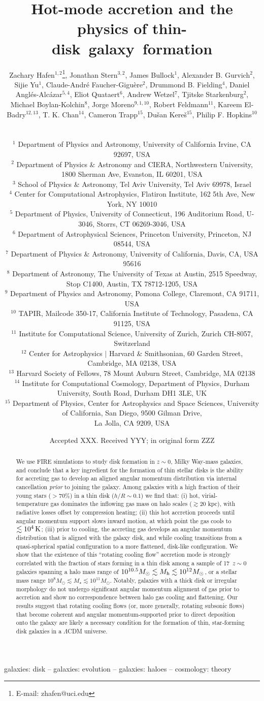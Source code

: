 \documentclass[fleqn,usenatbib]{mnras}
\title[Rotating cooling flows and thin galactic disks]{Hot-mode accretion and the physics of thin-disk~galaxy~formation}
\author[Hafen, Stern, Bullock et al.]{
\parbox{\textwidth}{
Zachary Hafen$^{1,2}$\thanks{E-mail: zhafen@uci.edu},
Jonathan Stern$^{3,2}$,
James Bullock$^{1}$,
Alexander B. Gurvich$^2$,
Sijie Yu$^1$,
Claude-Andr\'e Faucher-Gigu\`ere$^2$,
Drummond B. Fielding$^4$,
Daniel Angl\'es-Alc\'azar$^{5,4}$,
Eliot Quataert$^6$,
Andrew Wetzel$^7$,
Tjitske Starkenburg$^2$,
Michael Boylan-Kolchin$^8$,
Jorge Moreno$^{9,1,10}$,
Robert Feldmann$^{11}$,
Kareem El-Badry$^{12,13}$,
T. K. Chan$^{14}$,
Cameron Trapp$^{15}$,
Du\v{s}an Kere\v{s}$^{15}$,
Philip F. Hopkins$^{10}$
} \vspace{0.4cm}\\
\parbox{\textwidth}{
$^1$ Department of Physics and Astronomy, University of California Irvine, CA 92697, USA \\
$^2$ Department of Physics \& Astronomy and CIERA, Northwestern University, 1800 Sherman Ave, Evanston, IL 60201, USA \\
$^3$ School of Physics \& Astronomy, Tel Aviv University, Tel Aviv 69978, Israel \\
$^4$ Center for Computational Astrophysics, Flatiron Institute, 162 5th Ave, New York, NY 10010 \\
$^5$ Department of Physics, University of Connecticut, 196 Auditorium Road, U-3046, Storrs, CT 06269-3046, USA \\
$^6$ Department of Astrophysical Sciences, Princeton University, Princeton, NJ 08544, USA \\
$^7$ Department of Physics \& Astronomy, University of California, Davis, CA, USA 95616 \\
$^8$ Department of Astronomy, The University of Texas at Austin, 2515 Speedway, Stop C1400, Austin, TX 78712-1205, USA \\
$^9$ Department of Physics and Astronomy, Pomona College, Claremont, CA 91711, USA \\
$^{10}$ TAPIR, Mailcode 350-17, California Institute of Technology, Pasadena, CA 91125, USA \\
$^{11}$ Institute for Computational Science, University of Zurich, Zurich CH-8057, Switzerland \\
$^{12}$ Center for Astrophysics $|$ Harvard \& Smithsonian, 60 Garden Street, Cambridge, MA 02138, USA \\
$^{13}$ Harvard Society of Fellows, 78 Mount Auburn Street, Cambridge, MA 02138 \\
$^{14}$ Institute for Computational Cosmology, Department of Physics, Durham University, South Road, Durham DH1 3LE, UK \\
$^{15}$ Department of Physics, Center for Astrophysics and Space Sciences, University of California, San Diego, 9500 Gilman Drive, \\ La Jolla, CA 9209, USA \\
}
}
\date{Accepted XXX. Received YYY; in original form ZZZ}
\newcommand{\Nsample}{17}
\begin{document}
\label{firstpage}
\pagerange{\pageref{firstpage}--\pageref{lastpage}}
\maketitle

\begin{abstract}
We use FIRE simulations to study disk formation in $z\sim 0$, Milky Way-mass galaxies, and conclude that a key ingredient for the formation of thin stellar disks is the ability for accreting gas to develop an aligned angular momentum distribution via internal cancellation \textit{prior} to joining the galaxy.
Among galaxies with a high fraction of their young stars ($>70\%$) in a thin disk ($h/R \sim 0.1$) we find that:
(i) hot, virial-temperature gas dominates the inflowing gas mass on halo scales ($\gtrsim 20$ kpc), with radiative losses offset by compression heating;
(ii) this hot accretion proceeds until angular momentum support slows inward motion, at which point the gas cools to $\lesssim10^4\,{\rm K}$;
(iii) prior to cooling, the accreting gas develops an angular momentum distribution that is aligned with the galaxy disk, and while cooling transitions from a quasi-spherical spatial configuration to a more flattened, disk-like configuration.
We show that the existence of this ``rotating cooling flow'' accretion mode is strongly correlated with the fraction of stars forming in a thin disk among a sample of \Nsample\ $z\sim0$ galaxies spanning a halo mass range of $10^{10.5} M_\odot \lesssim M_{\rm h} \lesssim 10^{12} M_\odot$, or a stellar mass range $10^8 M_\odot \lesssim M_\star \lesssim 10^{11} M_\odot$.
Notably, galaxies with a thick disk or irregular morphology do not undergo significant angular momentum alignment of gas prior to accretion and show no correspondence between halo gas cooling and flattening.
Our results suggest that rotating cooling flows (or, more generally, rotating subsonic flows) that become coherent and angular momentum-supported prior to direct deposition onto the galaxy are likely a necessary condition for the formation of thin, star-forming disk galaxies in a $\Lambda$CDM universe.
\end{abstract}

\begin{keywords}
galaxies: disk -- galaxies: evolution -- galaxies: haloes -- cosmology: theory
\end{keywords}
\end{document}
